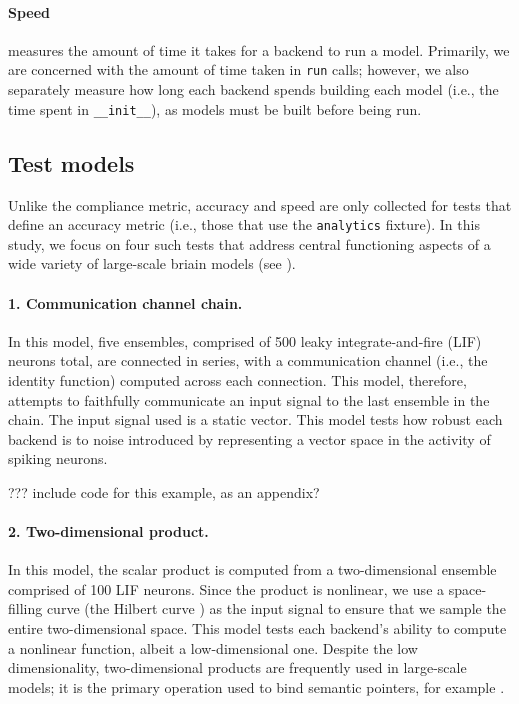 \documentclass{frontiersSCNS}
\begin{document}
\paragraph{Speed}
measures the amount of time it takes
for a backend to run a model.
Primarily, we are concerned with
the amount of time taken
in \texttt{run} calls;
however, we also separately measure how long
each backend spends building each model
(i.e., the time spent in \texttt{\_\_init\_\_}),
as models must be built before being run.

\subsection{Test models}

Unlike the compliance metric,
accuracy and speed are only collected
for tests that define an accuracy metric
(i.e., those that use the \texttt{analytics} fixture).
In this study, we focus on four such tests
that address central functioning aspects
of a wide variety of large-scale briain models
(see \cite{NEF or SPA book or both?}).

\paragraph{1. Communication channel chain.}
In this model,
five ensembles,
comprised of 500 leaky integrate-and-fire (LIF) neurons total,
are connected in series,
with a communication channel
(i.e., the identity function)
computed across each connection.
This model, therefore, attempts to faithfully
communicate an input signal to
the last ensemble in the chain.
The input signal used is a static vector.
This model tests how
robust each backend is to noise introduced
by representing a vector space
in the activity of spiking neurons.

??? include code for this example, as an appendix?

\paragraph{2. Two-dimensional product.}
In this model,
the scalar product is computed
from a two-dimensional ensemble
comprised of 100 LIF neurons.
Since the product is nonlinear,
we use a space-filling curve
(the Hilbert curve \cite{???})
as the input signal to ensure that
we sample the entire two-dimensional space.
This model tests each backend's
ability to compute a nonlinear function,
albeit a low-dimensional one.
Despite the low dimensionality,
two-dimensional products are frequently used
in large-scale models;
it is the primary operation used to
bind semantic pointers, for example
\cite{???}.
\end{document}
